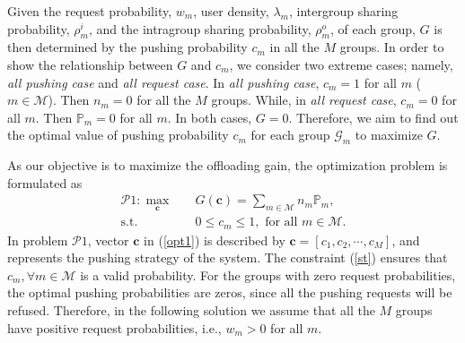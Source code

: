 \documentclass[12pt, draftclsnofoot, onecolumn]{IEEEtran}
\begin{document}
Given the request probability, $w_m$, user density, $\lambda_m$, intergroup sharing probability, $\rho_m^i$, and the intragroup sharing probability, $\rho_m^o$, of each group, $G$ is then determined by the pushing probability $c_m$ in all the $M$ groups. In order to show the relationship between $G$ and $c_m$, we consider two extreme cases; namely, \textit{all pushing case} and \textit{all request case}.
In \textit{all pushing case}, $c_m = 1$ for all $m$ ($m \in \mathcal{M}$). Then $n_{m}=0$ for all the $M$ groups. While, in \textit{all request case}, $c_m = 0$ for all $m$. Then $\mathbb{P}_m=0$ for all $m$. In both cases, $G=0$. Therefore, we aim to find out the optimal value of pushing probability $c_m$ for each group $\mathcal{G}_m$ to maximize $G$.

As our objective is to maximize the offloading gain, the optimization problem is formulated as
\begin{subequations}
\begin{align}
 \mathcal{P}1:\mathop{\max }_{\bm{c}}
                  &\quad  G(\bm{c}) =\sum \limits_{m \in \mathcal{M}} n_{m}\mathbb{P}_m,    \label{opt1}   \\
\textrm{s.t.} &\quad 0\leq c_m \leq 1 , \textrm{ for all } m \in  \mathcal{M}. \label{st}
\end{align}
\end{subequations}
In problem $\mathcal{P}1$, vector $\bm{c}$ in (\ref{opt1}) is described by $\bm{c} = [c_1,c_2,\cdots,c_M]$, and represents the pushing strategy of the system.
The constraint (\ref{st}) ensures that $c_m, \forall m \in \mathcal{M}$ is a valid probability. For the groups with zero request probabilities, the optimal pushing probabilities are zeros, since all the pushing requests will be refused. Therefore, in the following solution we assume that all the $M$ groups have positive request probabilities, i.e., $w_m>0$ for all $m$.
\end{document}
